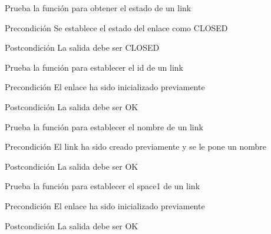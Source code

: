\begin{DoxyRefList}
\item[\label{test__test000152}%
\hypertarget{test__test000152}{}%
Global \hyperlink{link__test_8c_ac4dc29d0afa00ec9a10fc31415c70435}{test1\-\_\-link\-\_\-get\-\_\-state} ()]Prueba la función para obtener el estado de un link \begin{DoxyPrecond}{Precondición}
Se establece el estado del enlace como C\-L\-O\-S\-E\-D 
\end{DoxyPrecond}
\begin{DoxyPostcond}{Postcondición}
La salida debe ser C\-L\-O\-S\-E\-D  
\end{DoxyPostcond}

\item[\label{test__test000129}%
\hypertarget{test__test000129}{}%
Global \hyperlink{link__test_8c_ac2b67785fdf6bb85af93e985af9ee3f2}{test1\-\_\-link\-\_\-set\-\_\-id} ()]Prueba la función para establecer el id de un link \begin{DoxyPrecond}{Precondición}
El enlace ha sido inicializado previamente 
\end{DoxyPrecond}
\begin{DoxyPostcond}{Postcondición}
La salida debe ser O\-K  
\end{DoxyPostcond}

\item[\label{test__test000132}%
\hypertarget{test__test000132}{}%
Global \hyperlink{link__test_8c_ae0e478a0540bed26befc071591e3ff6c}{test1\-\_\-link\-\_\-set\-\_\-name} ()]Prueba la función para establecer el nombre de un link \begin{DoxyPrecond}{Precondición}
El link ha sido creado previamente y se le pone un nombre 
\end{DoxyPrecond}
\begin{DoxyPostcond}{Postcondición}
La salida debe ser O\-K  
\end{DoxyPostcond}

\item[\label{test__test000135}%
\hypertarget{test__test000135}{}%
Global \hyperlink{link__test_8c_a43deab7f0799cbd09d8d27c21bbb4a6c}{test1\-\_\-link\-\_\-set\-\_\-space1} ()]Prueba la función para establecer el space1 de un link \begin{DoxyPrecond}{Precondición}
El enlace ha sido inicializado previamente 
\end{DoxyPrecond}
\begin{DoxyPostcond}{Postcondición}
La salida debe ser O\-K  
\end{DoxyPostcond}


\end{DoxyRefList}

